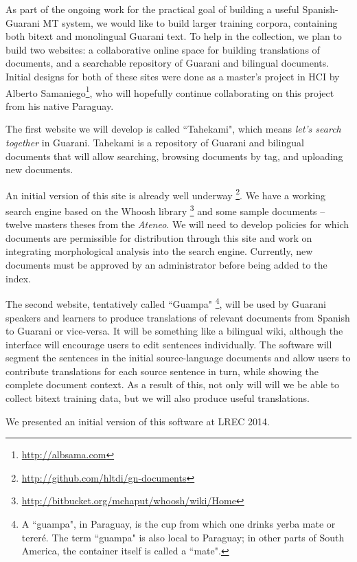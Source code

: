 
As part of the ongoing work for the practical goal of building a useful
Spanish-Guarani MT system, we would like to build larger training corpora,
containing both bitext and monolingual Guarani text.
To help in the collection, we plan to build two websites:
a collaborative online space for building translations of documents, 
and a searchable repository of Guarani and bilingual documents.
Initial designs for both of these sites were done as a master's project in HCI
by Alberto Samaniego\footnote{\url{http://albsama.com}}, who will hopefully
continue collaborating on this project from his native Paraguay.

The first website we will develop is called ``Tahekami", which means
\emph{let's search together} in Guarani.
Tahekami is a repository of Guarani and bilingual documents that will allow
searching, browsing documents by tag, and uploading new documents.

An initial version of this site is already well underway
\footnote{\url{http://github.com/hltdi/gn-documents}}.  We have a working
search engine based on the Whoosh library
\footnote{\url{http://bitbucket.org/mchaput/whoosh/wiki/Home}} and some sample
documents -- twelve masters theses from the \emph{Ateneo}. We will need to
develop policies for which documents are permissible for distribution through
this site and work on integrating morphological analysis into the search
engine. Currently, new documents must be approved by an administrator before
being added to the index.

The second website, tentatively called ``Guampa"
\footnote{A ``guampa", in Paraguay, is the cup from which one drinks yerba mate
or tereré. The term ``guampa" is also local to Paraguay; in other parts of
South America, the container itself is called a ``mate".},
will be used by Guarani speakers and learners to produce translations of
relevant documents from Spanish to Guarani or vice-versa.
It will be something like a bilingual wiki, although the interface will
encourage users to edit sentences individually.
The software will segment the sentences in the initial
source-language documents and allow users to contribute translations for each
source sentence in turn, while showing the complete document context.
As a result of this, not only will will we be able to collect bitext training
data, but we will also produce useful translations.

We presented an initial version of this software at LREC
2014\cite{RUDNICK14.151}.

